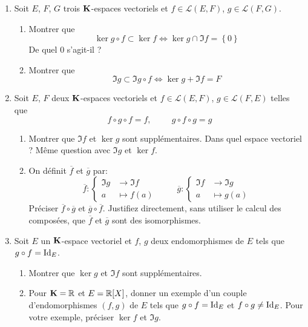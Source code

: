 \begin{enumerate}
 \item Soit $E$, $F$, $G$ trois $\mathbf{K}$-espaces vectoriels et $f\in \mathcal{L}(E,F)$, $g\in \mathcal{L}(F,G)$. 
\begin{enumerate}
 \item Montrer que
\begin{displaymath}
 \ker g\circ f \subset \ker f \Leftrightarrow \ker g \cap \Im f =\left\lbrace 0 \right\rbrace 
\end{displaymath}
De quel $0$ s'agit-il ?
\item Montrer que 
\begin{displaymath}
 \Im g \subset \Im g\circ f \Leftrightarrow \ker g + \Im f = F  
\end{displaymath}
\end{enumerate}
 \item Soit $E$, $F$ deux $\mathbf{K}$-espaces vectoriels et $f\in \mathcal{L}(E,F)$, $g\in \mathcal{L}(F,E)$ telles que
\begin{displaymath}
 f\circ g \circ f = f,\hspace{1cm} g \circ f \circ g =g
\end{displaymath}
\begin{enumerate}
 \item Montrer que $\Im f$ et $\ker g$ sont supplémentaires. Dans quel espace vectoriel ? Même question avec $\Im g$ et $\ker f$.
 \item On définit $\overline{f}$ et $\overline{g}$ par:
\begin{displaymath}
\overline{f}:
\left\lbrace  
\begin{aligned}
 \Im g &\rightarrow \Im f \\ a &\mapsto f(a)
\end{aligned}
\right.
\hspace{1cm} 
\overline{g}:
\left\lbrace  
\begin{aligned}
 \Im f &\rightarrow \Im g \\ a &\mapsto g(a)
\end{aligned}
\right.
\end{displaymath}
Préciser $\overline{f}\circ \overline{g}$ et $\overline{g}\circ \overline{f}$. Justifiez directement, sans utiliser le calcul des composées, que $\overline{f}$ et $\overline{g}$ sont des isomorphismes.
\end{enumerate}
\item Soit $E$ un $\mathbf{K}$-espace vectoriel et $f$, $g$ deux endomorphismes de $E$ tels que $g\circ f = \operatorname{Id}_E$.
\begin{enumerate}
 \item Montrer que $\ker g$ et $\Im f$ sont supplémentaires.
 \item Pour $\mathbf{K}=\mathbb{R}$ et $E=\mathbb{R}[X]$, donner un exemple d'un couple d'endomorphismes $(f,g)$ de $E$ tels que $g\circ f = \operatorname{Id}_E$ et $f\circ g \neq \operatorname{Id}_E$. Pour votre exemple, préciser $\ker f$ et $\Im g$.
\end{enumerate}

\end{enumerate}
